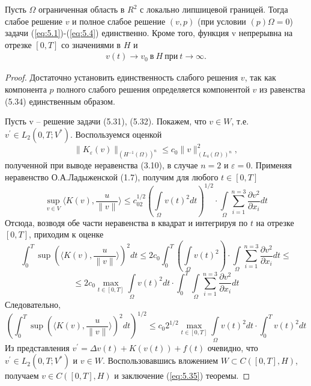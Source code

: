 \begin{theorem}
    Пусть $\Omega$ ограниченная область в $R^2$ с локально липшицевой границей. Тогда слабое решение $v$ и полное слабое решение $(v, p)$
    (при условии $(p) \Omega = 0$) задачи (\ref{eq:5.1})-(\ref{eq:5.4}) единственно. Кроме того, функция v непрерывна на отрезке $[0, T]$ со значениями в $H$ и
    \begin{equation}\label{eq:5.35}
        \begin{gathered}
            v(t) \rightarrow v_0 \  \textrm{в} \ H \ \textrm{при} \ t \rightarrow \infty.
        \end{gathered}
    \end{equation}
\end{theorem}
\begin{proof}
    Достаточно установить единственность слабого решения $v$, так как компонента $p$ полного слабого решения определяется компонентой $v$
    из равенства (5.34) единственным образом.

    Пусть v -- решение задачи (5.31), (5.32). Покажем, что $v \in W$, т.е. $v^\prime \in L_2(0, T; V^\ast)$.
    Воспользуемся оценкой
    $$\parallel K_\varepsilon (v) \parallel_{(H^{-1}(\Omega))^n} \le c_0 \parallel v \parallel^2_{(L_4(\Omega))^n},$$
    полученной при выводе неравенства (3.10), в случае $n = 2$ и $\varepsilon = 0$. Применяя неравенство О.А.Ладыженской (1.7), получим для любого $t \in [0, T]$
    $$\sup\limits_{v\in V}\langle K(v),\frac{u}{\parallel v\parallel}\rangle\le c_02^{1/2}(\int\limits_\Omega v(t)^2dt)^{1/2}\cdot\int\limits_\Omega\sum_{i=1}^{n=3}\frac{\partial v^2}{\partial x_i}dt$$
    Отсюда, возводя обе части неравенства в квадрат и интегрируя по $t$ на отрезке $[0, T]$, приходим к оценке
    $$\int_0^T \sup(\langle K(v),\frac{u}{\parallel v\parallel}\rangle)^2dt \le 2c_0\int_0^T(\int\limits_\Omega v(t)^2)\cdot\int\limits_\Omega\sum_{i=1}^{n=3}\frac{\partial v^2}{\partial x_i}dt\le$$
    $$\le 2c_0 \max\limits_{t\in[0,T]}\int\limits_\Omega v(t)^2dt\cdot\int_0^T\int\limits_\Omega\sum_{i=1}^{n=3}\frac{\partial v^2}{\partial x_i}dt$$
    Следовательно,
    $$(\int_0^T \sup(\langle K(v),\frac{u}{\parallel v\parallel}\rangle)^2dt)^{1/2}\le c_0 2^{1/2}\max\limits_{t\in[0,T]}\int\limits_\Omega v(t)^2dt\cdot\int_0^T v(t)^2dt$$
    Из представления $v^\prime = \Delta v(t) + K(v(t)) + f(t)$ очевидно, что $v^\prime \in L_2(0, T; V^\ast)$ и $v \in W$.
    Воспользовавшись вложением $W \subset C([0, T], H)$, получаем $v \in C([0, T], H)$ и заключение (\ref{eq:5.35}) теоремы.


\end{proof}
